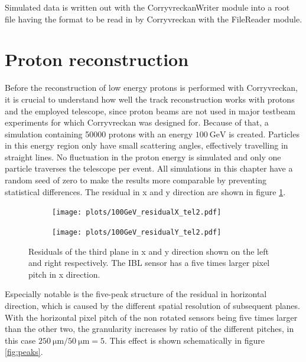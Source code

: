 Simulated data is written out with the CorryvreckanWriter module into a root file having the format to be read
in by Corryvreckan with the FileReader module.

\section{Proton reconstruction}\label{sec:proton_reconstruction}
Before the reconstruction of low energy protons is performed with Corryvreckan, it is crucial to understand how well the
track reconstruction works with protons and the employed telescope, since proton beams are not used in major testbeam
experiments for which Corryvreckan was designed for. Because of that, a simulation containing 50000 protons
with an energy $\SI{100}{\giga\eV}$ is created.
Particles in this energy region only have small scattering angles, effectively travelling
in straight lines.
No fluctuation in the proton energy is simulated and only one particle traverses
the telescope per event. All simulations in this chapter have a random seed of zero to make the results more comparable by preventing
statistical differences.
The residual in x and y direction are shown in figure \ref{fig:100GeV}.

\begin{figure}
  \hspace{-2.5cm}
  \begin{subfigure}{0.62\textwidth}
      \centering
      \texttt{[image: plots/100GeV\_residualX\_tel2.pdf]}
  \end{subfigure}
  \begin{subfigure}{0.62\textwidth}
      \hspace{0.95cm}
      \texttt{[image: plots/100GeV\_residualY\_tel2.pdf]}
  \end{subfigure}
  \caption{Residuals of the third plane in x and y direction shown on the left and right respectively.
  The IBL sensor has a five times larger pixel pitch in x direction. }
  \label{fig:100GeV}
\end{figure}

Especially notable is the five-peak structure of the residual in horizontal direction, which is caused by the different
spatial resolution of subsequent planes. With the horizontal pixel pitch of the non rotated sensors being
five times larger than the other two, the granularity increases by ratio of the different pitches, in this case
$\SI{250}{\micro\meter}/\SI{50}{\micro\meter} = 5$. This effect is shown schematically in figure \ref{fig:peaks}.

